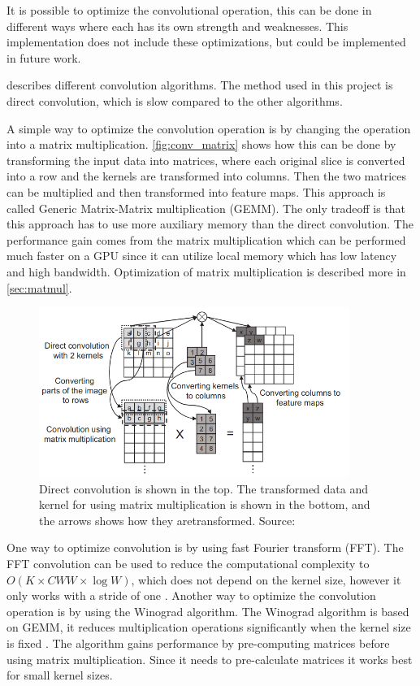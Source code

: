 It is possible to optimize the convolutional operation, this can be done in different ways where each has its own strength and weaknesses.
This implementation does not include these optimizations, but could be implemented in future work.

\cite{perfomance_analysis_cnn} describes different convolution algorithms.
The method used in this project is direct convolution, which is slow compared to the other algorithms.

A simple way to optimize the convolution operation is by changing the operation into a matrix multiplication. \autoref{fig:conv_matrix} shows how this can be done by transforming the input data into matrices, where each original slice is converted into a row and the kernels are transformed into columns. Then the two matrices can be multiplied and then transformed into feature maps. This approach is called Generic Matrix-Matrix multiplication (GEMM). The only tradeoff is that this approach has to use more auxiliary memory than the direct convolution.
The performance gain comes from the matrix multiplication which can be performed much faster on a GPU since it can utilize local memory which has low latency and high bandwidth. Optimization of matrix multiplication is described more in \autoref{sec:matmul}.

\begin{figure}
    \centering
    \includegraphics[width=0.9\textwidth]{assets/conv-matrix.png}
    \caption{Direct convolution is shown in the top. The transformed data and kernel for using matrix multiplication is shown in the bottom, and the arrows shows how they aretransformed. Source: \cite{perfomance_analysis_cnn}}
    \label{fig:conv_matrix}
\end{figure}

One way to optimize convolution is by using fast Fourier transform (FFT). The FFT convolution can be used to reduce the computational complexity to $O(K\times CWW \times \log W)$, which does not depend on the kernel size, however it only works with a stride of one \cite{perfomance_analysis_cnn}.
Another way to optimize the convolution operation is by using the Winograd algorithm. The Winograd algorithm is based on GEMM, it reduces multiplication operations significantly when the kernel size is fixed \cite{perfomance_analysis_cnn}. The algorithm gains performance by pre-computing matrices before using matrix multiplication. Since it needs to pre-calculate matrices it works best for small kernel sizes.

